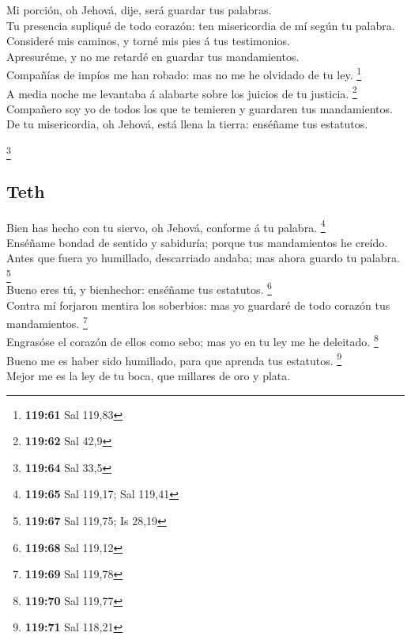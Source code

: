  Mi porción, oh Jehová, dije, será guardar tus palabras.\\
 Tu presencia supliqué de todo corazón: ten misericordia de
mí según tu palabra.\\
 Consideré mis caminos, y torné mis pies á tus
testimonios.\\
 Apresuréme, y no me retardé en guardar tus mandamientos.\\
 Compañías de impíos me han robado: mas no me he olvidado
de tu ley. \footnote{\textbf{119:61} Sal 119,83}\\
 A media noche me levantaba á alabarte sobre los juicios de
tu justicia. \footnote{\textbf{119:62} Sal 42,9}\\
 Compañero soy yo de todos los que te temieren y guardaren
tus mandamientos.\\
 De tu misericordia, oh Jehová, está llena la tierra:
enséñame tus estatutos.

\footnote{\textbf{119:64} Sal 33,5}

\hypertarget{teth}{%
\subsection{Teth}\label{teth}}

 Bien has hecho con tu siervo, oh Jehová, conforme á tu
palabra. \footnote{\textbf{119:65} Sal 119,17; Sal 119,41}\\
 Enséñame bondad de sentido y sabiduría; porque tus
mandamientos he creído.\\
 Antes que fuera yo humillado, descarriado andaba; mas
ahora guardo tu palabra. \footnote{\textbf{119:67} Sal 119,75; Is 28,19}\\
 Bueno eres tú, y bienhechor: enséñame tus estatutos.
\footnote{\textbf{119:68} Sal 119,12}\\
 Contra mí forjaron mentira los soberbios: mas yo guardaré
de todo corazón tus mandamientos. \footnote{\textbf{119:69} Sal 119,78}\\
 Engrasóse el corazón de ellos como sebo; mas yo en tu ley
me he deleitado. \footnote{\textbf{119:70} Sal 119,77}\\
 Bueno me es haber sido humillado, para que aprenda tus
estatutos. \footnote{\textbf{119:71} Sal 118,21}\\
 Mejor me es la ley de tu boca, que millares de oro y
plata.

